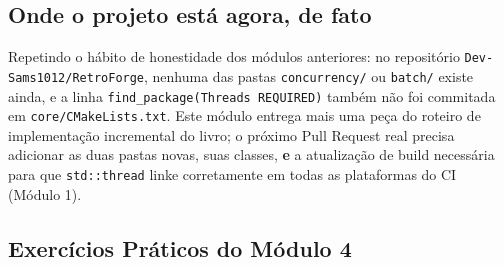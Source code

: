 \subsection{Onde o projeto está agora, de fato}

Repetindo o hábito de honestidade dos módulos anteriores: no repositório \texttt{Dev-Sams1012/RetroForge}, nenhuma das pastas \texttt{concurrency/} ou \texttt{batch/} existe ainda, e a linha \texttt{find\_package(Threads REQUIRED)} também não foi commitada em \texttt{core/CMakeLists.txt}. Este módulo entrega mais uma peça do roteiro de implementação incremental do livro; o próximo Pull Request real precisa adicionar as duas pastas novas, suas classes, \textbf{e} a atualização de build necessária para que \texttt{std::thread} linke corretamente em todas as plataformas do CI (Módulo 1).

\subsection{Exercícios Práticos do Módulo 4}

